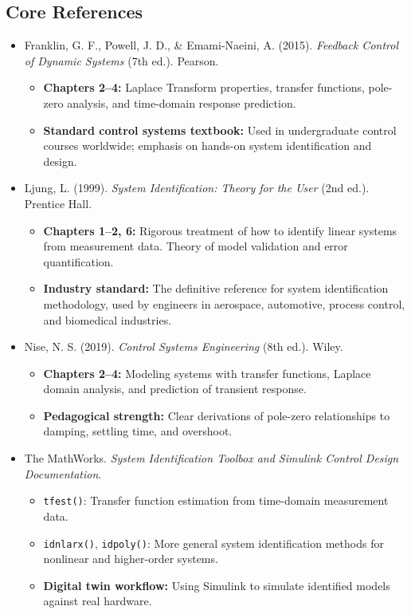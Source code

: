 \documentclass[11pt,letterpaper]{article}
\begin{document}
\subsection*{Core References}

\begin{itemize}
    \item Franklin, G. F., Powell, J. D., \& Emami-Naeini, A. (2015). \textit{Feedback Control of Dynamic Systems} (7th ed.). Pearson.
    \begin{itemize}
        \item \textbf{Chapters 2--4:} Laplace Transform properties, transfer functions, pole-zero analysis, and time-domain response prediction.
        \item \textbf{Standard control systems textbook:} Used in undergraduate control courses worldwide; emphasis on hands-on system identification and design.
    \end{itemize}

    \item Ljung, L. (1999). \textit{System Identification: Theory for the User} (2nd ed.). Prentice Hall.
    \begin{itemize}
        \item \textbf{Chapters 1--2, 6:} Rigorous treatment of how to identify linear systems from measurement data. Theory of model validation and error quantification.
        \item \textbf{Industry standard:} The definitive reference for system identification methodology, used by engineers in aerospace, automotive, process control, and biomedical industries.
    \end{itemize}

    \item Nise, N. S. (2019). \textit{Control Systems Engineering} (8th ed.). Wiley.
    \begin{itemize}
        \item \textbf{Chapters 2--4:} Modeling systems with transfer functions, Laplace domain analysis, and prediction of transient response.
        \item \textbf{Pedagogical strength:} Clear derivations of pole-zero relationships to damping, settling time, and overshoot.
    \end{itemize}

    \item The MathWorks. \textit{System Identification Toolbox and Simulink Control Design Documentation}.
    \begin{itemize}
        \item \texttt{tfest()}: Transfer function estimation from time-domain measurement data.
        \item \texttt{idnlarx()}, \texttt{idpoly()}: More general system identification methods for nonlinear and higher-order systems.
        \item \textbf{Digital twin workflow:} Using Simulink to simulate identified models against real hardware.
    \end{itemize}


\end{itemize}
\end{document}

